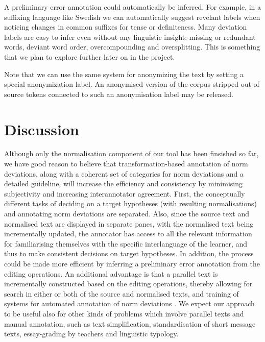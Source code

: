 \documentclass[10pt, a4paper]{article}
\newcommand{\elena}[1]{{\color{BrickRed}{Elena: #1}}}
\newcommand{\normAnn}[0]{our tool }
\begin{document}
A preliminary error annotation could automatically be inferred.
For example, in a suffixing language like Swedish we can automatically
suggest revelant labels when noticing changes in common suffixes for tense
or definiteness.
Many deviation labels are easy to infer even without any linguistic
insight: missing or redundant words, deviant word order, overcompounding
and oversplitting.
This is something that we plan to explore further later on in the project.

Note that we can use the same system for anonymizing the text by setting a
special anonymization label. An anonymised version of the corpus stripped
out of source tokens connected to such an anonymisation label may be released.

\section{Discussion}
\label{sec:discussion}


Although only the normalisation component of \normAnn has been finsished so far, we have good reason to believe that transformation-based annotation of norm deviations, along with a coherent set of categories for norm deviations and a detailed guideline, will increase the efficiency and consistency by minimising subjectivity and increasing interannotator agreement. First, the conceptually different tasks of deciding on a target hypotheses (with resulting normalisations) and annotating norm deviations are separated. Also, since the source text and normalised text are displayed in separate panes, with the normalised text being incrementally updated, the annotator has access to all the relevant information for familiarising themselves with the specific interlanguage of the learner, and thus to make consistent decisions on target hypotheses. In addition, the process could be made more efficient by inferring a preliminary error annotation from the editing operations. An additional advantage is that a parallel text is incrementally constructed based on the editing operations, thereby allowing for search in either or both of the source and normalised texts, and training of systems for automated annotation of norm deviations \cite{sproat2016rnn}. We expect our approach to be useful also for other kinds of problems which involve parallel texts and manual annotation, such as text simplification, standardisation of short message texts, essay-grading by teachers and linguistic typology. %
\end{document}
